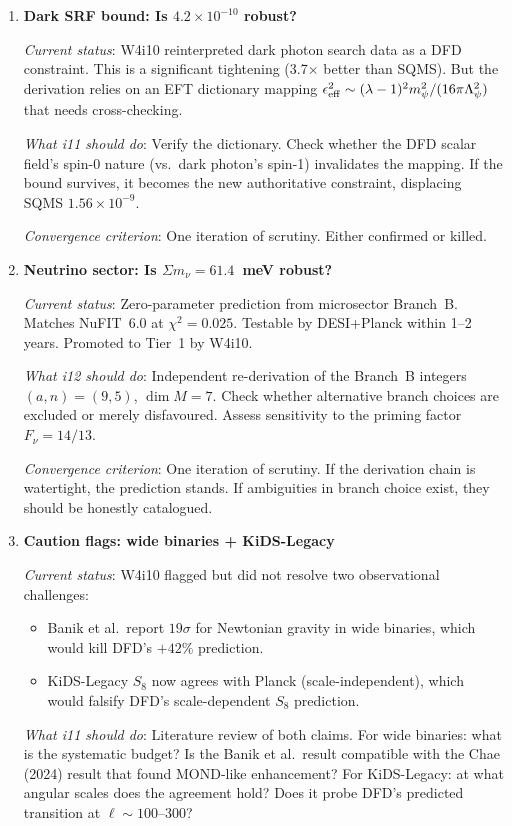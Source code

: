 \documentclass[11pt]{article}
\newcommand{\ee}[1]{\times 10^{#1}}
\begin{document}
\begin{tcolorbox}[colback=red!3!white, colframe=red!60!black,
  title=\textbf{TOP 5 OPEN QUESTIONS}]
\begin{enumerate}
\item \textbf{Dark SRF bound: Is $4.2\ee{-10}$ robust?}

  \emph{Current status}: W4i10 reinterpreted dark photon search data
  as a DFD constraint. This is a significant tightening (3.7$\times$
  better than SQMS). But the derivation relies on an EFT dictionary
  mapping $\epsilon_{\rm eff}^2 \sim (\lambda-1)^2 m_\psi^2 / (16\pi
  \Lambda_\psi^2)$ that needs cross-checking.

  \emph{What i11 should do}: Verify the dictionary. Check whether
  the DFD scalar field's spin-0 nature (vs.\ dark photon's spin-1)
  invalidates the mapping. If the bound survives, it becomes the new
  authoritative constraint, displacing SQMS $1.56\ee{-9}$.

  \emph{Convergence criterion}: One iteration of scrutiny. Either
  confirmed or killed.

\item \textbf{Neutrino sector: Is $\Sigma m_\nu = 61.4$~meV robust?}

  \emph{Current status}: Zero-parameter prediction from microsector
  Branch~B. Matches NuFIT~6.0 at $\chi^2 = 0.025$. Testable by
  DESI+Planck within 1--2 years. Promoted to Tier~1 by W4i10.

  \emph{What i12 should do}: Independent re-derivation of the Branch~B
  integers $(a,n) = (9,5)$, $\dim M = 7$. Check whether alternative
  branch choices are excluded or merely disfavoured. Assess sensitivity
  to the priming factor $F_\nu = 14/13$.

  \emph{Convergence criterion}: One iteration of scrutiny. If the
  derivation chain is watertight, the prediction stands. If ambiguities
  in branch choice exist, they should be honestly catalogued.

\item \textbf{Caution flags: wide binaries + KiDS-Legacy}

  \emph{Current status}: W4i10 flagged but did not resolve two
  observational challenges:
  \begin{itemize}[nosep]
  \item Banik et al.\ report $19\sigma$ for Newtonian gravity in wide
    binaries, which would kill DFD's $+42\%$ prediction.
  \item KiDS-Legacy $S_8$ now agrees with Planck (scale-independent),
    which would falsify DFD's scale-dependent $S_8$ prediction.
  \end{itemize}

  \emph{What i11 should do}: Literature review of both claims. For wide
  binaries: what is the systematic budget? Is the Banik et al.\ result
  compatible with the Chae (2024) result that found MOND-like enhancement?
  For KiDS-Legacy: at what angular scales does the agreement hold? Does
  it probe DFD's predicted transition at $\ell \sim 100$--300?


\end{enumerate}
\end{tcolorbox}
\end{document}
